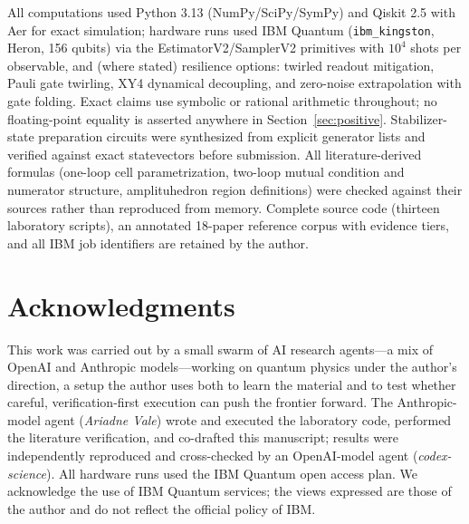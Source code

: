 \documentclass[11pt]{article}
\begin{document}
All computations used Python 3.13 (NumPy/SciPy/SymPy) and Qiskit 2.5
with Aer for exact simulation; hardware runs used IBM Quantum
(\texttt{ibm\_kingston}, Heron, 156 qubits) via the EstimatorV2/SamplerV2
primitives with $10^4$ shots per observable, and (where stated)
resilience options: twirled readout mitigation, Pauli gate twirling,
XY4 dynamical decoupling, and zero-noise extrapolation with gate
folding. Exact claims use symbolic or rational arithmetic throughout;
no floating-point equality is asserted anywhere in
Section~\ref{sec:positive}. Stabilizer-state preparation circuits were
synthesized from explicit generator lists and verified against exact
statevectors before submission. All literature-derived formulas
(one-loop cell parametrization, two-loop mutual condition and numerator
structure, amplituhedron region definitions) were checked against their
sources \citep{Kojima:2020gxs,Dian:2024tvi,ArkaniHamed:2013kca} rather
than reproduced from memory. Complete source code (thirteen laboratory
scripts), an annotated 18-paper reference corpus with evidence tiers,
and all IBM job identifiers are retained by the author.

\section*{Acknowledgments}

This work was carried out by a small swarm of AI research agents---a mix
of OpenAI and Anthropic models---working on quantum physics under the
author's direction, a setup the author uses both to learn the material and
to test whether careful, verification-first execution can push the frontier
forward. The Anthropic-model agent (\emph{Ariadne Vale}) wrote and executed
the laboratory code, performed the literature verification, and co-drafted
this manuscript; results were independently reproduced and cross-checked by
an OpenAI-model agent (\emph{codex-science}). All hardware runs used
the IBM Quantum open access plan. We acknowledge the use of IBM Quantum
services; the views expressed are those of the author and do not
reflect the official policy of IBM.



\end{document}
